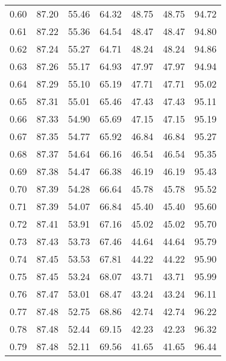 \begin{tabular}{|c|c|c|c|c|c|c|}
      0.60 &     87.20 &     55.46 &      64.32 &   48.75 &      48.75 &         94.72 \\
      0.61 &     87.22 &     55.36 &      64.54 &   48.47 &      48.47 &         94.80 \\
      0.62 &     87.24 &     55.27 &      64.71 &   48.24 &      48.24 &         94.86 \\
      0.63 &     87.26 &     55.17 &      64.93 &   47.97 &      47.97 &         94.94 \\
      0.64 &     87.29 &     55.10 &      65.19 &   47.71 &      47.71 &         95.02 \\
      0.65 &     87.31 &     55.01 &      65.46 &   47.43 &      47.43 &         95.11 \\
      0.66 &     87.33 &     54.90 &      65.69 &   47.15 &      47.15 &         95.19 \\
      0.67 &     87.35 &     54.77 &      65.92 &   46.84 &      46.84 &         95.27 \\
      0.68 &     87.37 &     54.64 &      66.16 &   46.54 &      46.54 &         95.35 \\
      0.69 &     87.38 &     54.47 &      66.38 &   46.19 &      46.19 &         95.43 \\
      0.70 &     87.39 &     54.28 &      66.64 &   45.78 &      45.78 &         95.52 \\
      0.71 &     87.39 &     54.07 &      66.84 &   45.40 &      45.40 &         95.60 \\
      0.72 &     87.41 &     53.91 &      67.16 &   45.02 &      45.02 &         95.70 \\
      0.73 &     87.43 &     53.73 &      67.46 &   44.64 &      44.64 &         95.79 \\
      0.74 &     87.45 &     53.53 &      67.81 &   44.22 &      44.22 &         95.90 \\
      0.75 &     87.45 &     53.24 &      68.07 &   43.71 &      43.71 &         95.99 \\
      0.76 &     87.47 &     53.01 &      68.47 &   43.24 &      43.24 &         96.11 \\
      0.77 &     87.48 &     52.75 &      68.86 &   42.74 &      42.74 &         96.22 \\
      0.78 &     87.48 &     52.44 &      69.15 &   42.23 &      42.23 &         96.32 \\
      0.79 &     87.48 &     52.11 &      69.56 &   41.65 &      41.65 &         96.44 \\

\end{tabular}

